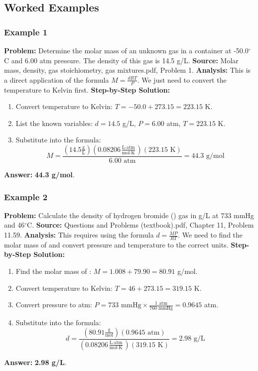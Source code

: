 \documentclass{article}
\begin{document}
\subsection{Worked Examples}
\subsubsection{Example 1}
\textbf{Problem:} Determine the molar mass of an unknown gas in a container at -50.0$^\circ$C and 6.00 atm pressure. The density of this gas is 14.5 g/L.
\textbf{Source:} Molar mass, density, gas stoichiometry, gas mixtures.pdf, Problem 1.
\textbf{Analysis:} This is a direct application of the formula $M = \frac{dRT}{P}$. We just need to convert the temperature to Kelvin first.
\textbf{Step-by-Step Solution:}
\begin{enumerate}
    \item Convert temperature to Kelvin: $T = -50.0 + 273.15 = 223.15$ K.
    \item List the known variables: $d=14.5$ g/L, $P=6.00$ atm, $T=223.15$ K.
    \item Substitute into the formula:
    \[ M = \frac{(14.5 \frac{\text{g}}{\text{L}})(0.08206 \frac{\text{L}\cdot\text{atm}}{\text{mol}\cdot\text{K}})(223.15 \text{ K})}{6.00 \text{ atm}} = 44.3 \text{ g/mol} \]
\end{enumerate}
\textbf{Answer:} \textbf{44.3 g/mol}.

\subsubsection{Example 2}
\textbf{Problem:} Calculate the density of hydrogen bromide () gas in g/L at 733 mmHg and 46$^\circ$C.
\textbf{Source:} Questions and Problems (textbook).pdf, Chapter 11, Problem 11.59.
\textbf{Analysis:} This requires using the formula $d = \frac{MP}{RT}$. We need to find the molar mass of  and convert pressure and temperature to the correct units.
\textbf{Step-by-Step Solution:}
\begin{enumerate}
    \item Find the molar mass of : $M = 1.008 + 79.90 = 80.91$ g/mol.
    \item Convert temperature to Kelvin: $T = 46 + 273.15 = 319.15$ K.
    \item Convert pressure to atm: $P = 733 \text{ mmHg} \times \frac{1 \text{ atm}}{760 \text{ mmHg}} = 0.9645$ atm.
    \item Substitute into the formula:
    \[ d = \frac{(80.91 \frac{\text{g}}{\text{mol}})(0.9645 \text{ atm})}{(0.08206 \frac{\text{L}\cdot\text{atm}}{\text{mol}\cdot\text{K}})(319.15 \text{ K})} = 2.98 \text{ g/L} \]
\end{enumerate}
\textbf{Answer:} \textbf{2.98 g/L}.
\end{document}
